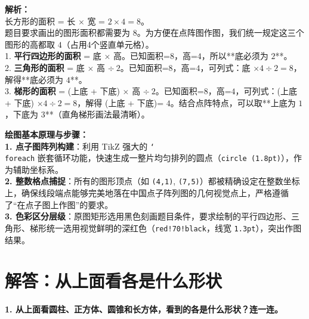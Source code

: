 \vspace{0.8cm}

{\small\color{gray}
\textbf{解析：}\\
长方形的面积 = 长 $\times$ 宽 = $2 \times 4 = 8$。\\
题目要求画出的图形面积都需要为 $8$。为方便在点阵图作图，我们统一规定这三个图形的高都取 $4$（占用4个竖直单元格）。\\
1. \textbf{平行四边形的面积} = 底 $\times$ 高。已知面积=$8$，高=$4$，所以**底必须为 $2$**。\\
2. \textbf{三角形的面积} = 底 $\times$ 高 $\div\ 2$。已知面积=$8$，高=$4$，可列式：底 $\times 4 \div 2 = 8$，解得**底必须为 $4$**。\\
3. \textbf{梯形的面积} = (上底 + 下底) $\times$ 高 $\div\ 2$。已知面积=$8$，高=$4$，可列式：(上底 + 下底) $\times 4 \div 2 = 8$，解得 (上底 + 下底)= $4$。结合点阵特点，可以取**上底为 $1$，下底为 $3$**（直角梯形画法最清晰）。
}

\vspace{0.6cm}

{\small\color{blue!70!black}
\textbf{绘图基本原理与步骤：}\\
\textbf{1. 点子图阵列构建}：利用 TikZ 强大的 \texttt{\char`\\foreach} 嵌套循环功能，快速生成一整片均匀排列的圆点（\texttt{circle (1.8pt)}），作为辅助坐标系。\\
\textbf{2. 整数格点捕捉}：所有的图形顶点（如 \texttt{(4,1)}, \texttt{(7,5)}）都被精确设定在整数坐标上，确保线段端点能够完美地落在中国点子阵列图的几何视觉点上，严格遵循了“在点子图上作图”的要求。\\
\textbf{3. 色彩区分层级}：原图矩形选用黑色刻画题目条件，要求绘制的平行四边形、三角形、梯形统一选用视觉鲜明的深红色（\texttt{red!70!black}，线宽 \texttt{1.3pt}），突出作图结果。
}

\newpage


\section{解答：从上面看各是什么形状}

\vspace{0.4cm}

\noindent\textbf{1. 从上面看圆柱、正方体、圆锥和长方体，看到的各是什么形状？连一连。}

\vspace{1.2cm}

